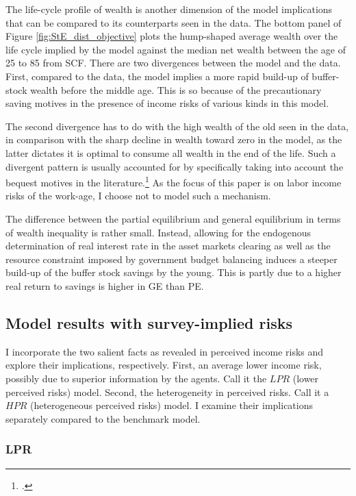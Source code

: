 The life-cycle profile of wealth is another dimension of the model implications that can be compared to its counterparts seen in the data. The bottom panel of Figure  \ref{fig:StE_dist_objective} plots the hump-shaped average wealth over the life cycle implied by the model against the median net wealth between the age of 25 to 85 from SCF. There are two divergences between the model and the data. First, compared to the data, the model implies a more rapid build-up of buffer-stock wealth before the middle age. This is so because of the precautionary saving motives in the presence of income risks of various kinds in this model. 

The second divergence has to do with the high wealth of the old seen in the data, in comparison with the sharp decline in wealth toward zero in the model, as the latter dictates it is optimal to consume all wealth in the end of the life. Such a divergent pattern is usually accounted for by specifically taking into account the bequest motives in the literature.\footnote{\cite{de2004wealth}.} As the focus of this paper is on labor income risks of the work-age, I choose not to model such a mechanism. 

The difference between the partial equilibrium and general equilibrium in terms of wealth inequality is rather small. Instead, allowing for the endogenous determination of real interest rate in the asset markets clearing as well as the resource constraint imposed by government budget balancing induces a steeper build-up of the buffer stock savings by the young. This is partly due to a higher real return to savings is higher in GE than PE. 

\subsection{Model results with survey-implied risks}

I incorporate the two salient facts as revealed in perceived income risks and explore their implications, respectively. First, an average lower income risk, possibly due to superior information by the agents. Call it the $LPR$ (lower perceived risks) model. Second, the heterogeneity in perceived risks. Call it a $HPR$ (heterogeneous perceived risks) model. I examine their implications separately compared to the benchmark model. 

\subsubsection{LPR}

